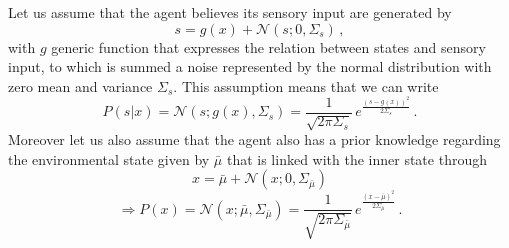 \documentclass[a4paper, 10pt]{article}
\begin{document}
Let us assume that the agent believes its sensory input are generated by
\begin{equation}
s = g(x) + \mathcal{N}(s;0,\Sigma_s) \, ,
\label{eqn:input}
\end{equation}
with $g$ generic function that expresses the relation between states and sensory input, to which is summed a noise represented by the normal distribution with zero mean and variance $\Sigma_s$. This assumption means that we can write
\begin{equation}
P(s|x) = \mathcal{N}(s;g(x),\Sigma_s) = \frac{1}{\sqrt{ 2 \pi \Sigma_{s}}} \, e^{\frac{(s-g(x))^2}{2 \Sigma_{s}}} \, .
\end{equation}
Moreover let us also assume that the agent also has a prior knowledge regarding the environmental state given by $\bar{\mu}$ that is linked with the inner state through
\begin{equation}
x = \bar{\mu} + \mathcal{N}(x;0,\Sigma_{\bar{\mu}})
\end{equation}
\begin{equation}
\Rightarrow P(x) = \mathcal{N}(x;\bar{\mu},\Sigma_{\bar{\mu}}) =\frac{1}{\sqrt{ 2 \pi \Sigma_{\bar{\mu}}}} \, e^{\frac{(x-\bar{\mu})^2}{2 \Sigma_{\bar{\mu}}}} \, .
\end{equation}
\end{document}
